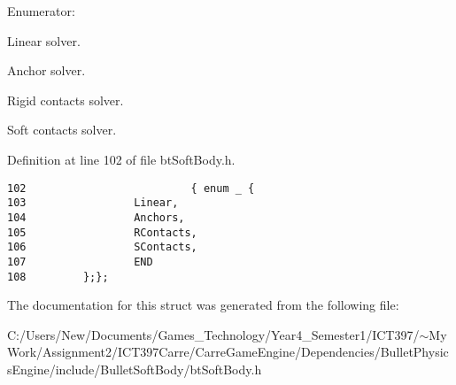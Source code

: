 \begin{Desc}
\item[Enumerator: ]\par
\begin{description}
\item[{\em 
\hypertarget{structbt_soft_body_1_1e_p_solver_5d6ab41a09da7333bc2047b4ea14bf86d1de203597e3f891a95c3aaf4f805e84}{
Anchors}
\label{structbt_soft_body_1_1e_p_solver_5d6ab41a09da7333bc2047b4ea14bf86d1de203597e3f891a95c3aaf4f805e84}
}]Linear solver. \item[{\em 
\hypertarget{structbt_soft_body_1_1e_p_solver_5d6ab41a09da7333bc2047b4ea14bf8618826149c80118f73e906b4966c69891}{
RContacts}
\label{structbt_soft_body_1_1e_p_solver_5d6ab41a09da7333bc2047b4ea14bf8618826149c80118f73e906b4966c69891}
}]Anchor solver. \item[{\em 
\hypertarget{structbt_soft_body_1_1e_p_solver_5d6ab41a09da7333bc2047b4ea14bf861ff50fff0983fbc2e4ae19997d7bfb4e}{
SContacts}
\label{structbt_soft_body_1_1e_p_solver_5d6ab41a09da7333bc2047b4ea14bf861ff50fff0983fbc2e4ae19997d7bfb4e}
}]Rigid contacts solver. \item[{\em 
\hypertarget{structbt_soft_body_1_1e_p_solver_5d6ab41a09da7333bc2047b4ea14bf86f5b5c91f8cb6d3d29ee7bb11e1ce5610}{
END}
\label{structbt_soft_body_1_1e_p_solver_5d6ab41a09da7333bc2047b4ea14bf86f5b5c91f8cb6d3d29ee7bb11e1ce5610}
}]Soft contacts solver. \end{description}
\end{Desc}



Definition at line 102 of file btSoftBody.h.

\begin{Code}\begin{verbatim}102                          { enum _ {
103                 Linear,         
104                 Anchors,        
105                 RContacts,      
106                 SContacts,      
107                 END
108         };};
\end{verbatim}
\end{Code}




The documentation for this struct was generated from the following file:\begin{CompactItemize}
\item 
C:/Users/New/Documents/Games\_\-Technology/Year4\_\-Semester1/ICT397/$\sim$My Work/Assignment2/ICT397Carre/CarreGameEngine/Dependencies/BulletPhysicsEngine/include/BulletSoftBody/btSoftBody.h\end{CompactItemize}
